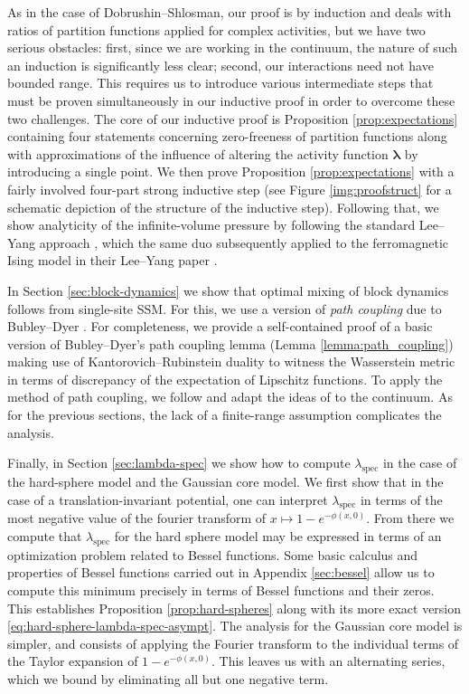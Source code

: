 \documentclass[10pt]{amsart}
\theoremstyle{definition}
\theoremstyle{remark}
\newcommand{\spec}{{\mathrm{spec}}}
\newcommand{\blambda}{{\boldsymbol{\lambda}}}
\newcommand{\potential}{\phi}
\begin{document}
	As in the case of Dobrushin--Shlosman, our proof is by induction and deals
	with ratios of partition functions applied for complex activities, but we have two serious obstacles: first, since we are working in the continuum, the nature of such an induction is significantly less clear; second, our interactions need not have bounded range.  This requires us to introduce various intermediate steps that must be proven simultaneously in our inductive proof in order to overcome these two challenges.  The core of our inductive proof is Proposition \ref{prop:expectations} containing four statements concerning zero-freeness of partition functions along with approximations of the influence of altering the activity function $\blambda$ by introducing a single point.  We then prove Proposition \ref{prop:expectations} with a fairly involved four-part strong inductive step (see Figure \ref{img:proofstruct} for a schematic depiction of the structure of the inductive step). Following that, we show analyticity of the infinite-volume pressure by following the standard Lee--Yang approach \cite{yang1952statistical}, which the same duo subsequently applied to the ferromagnetic Ising model in their Lee--Yang paper \cite{lee1952statistical}.  
	
	In Section \ref{sec:block-dynamics} we show that optimal mixing of block dynamics follows from single-site SSM. For this, we use a version of \emph{path coupling} due to Bubley--Dyer \cite{bubley1997path}.  For completeness, we provide a self-contained proof of a basic version of Bubley--Dyer's path coupling lemma (Lemma \ref{lemma:path_coupling}) making use of Kantorovich--Rubinstein duality to witness the Wasserstein metric in terms of discrepancy of the expectation of Lipschitz functions.  To apply the method of path coupling, we follow \cite{michelen2022strong,helmuth2022correlation} and adapt the ideas of \cite{dyer2004mixing} to the continuum.  As for the previous sections, the lack of a finite-range assumption complicates the analysis.
	
	Finally, in Section \ref{sec:lambda-spec} we show how to compute $\lambda_\spec$ in the case of the hard-sphere model and the Gaussian core model. We first show that in the case of a translation-invariant potential, one can interpret $\lambda_\spec$ in terms of the most negative value of the fourier transform of $x \mapsto 1 - e^{-\phi(x,0)}$.  
	From there we compute that $\lambda_\spec$ for the hard sphere model may be expressed in terms of an optimization problem related to Bessel functions.  
	Some basic calculus and properties of Bessel functions carried out in Appendix \ref{sec:bessel} allow us to compute this minimum precisely in terms of Bessel functions and their zeros.  
	This establishes Proposition \ref{prop:hard-spheres} along with its more exact version \eqref{eq:hard-sphere-lambda-spec-asympt}.  
	The analysis for the Gaussian core model is simpler, and consists of applying the Fourier transform to the individual terms of the Taylor expansion of $1 - e^{-\potential(x, 0)}$.
	This leaves us with an alternating series, which we bound by eliminating all but one negative term.
	
\end{document}
